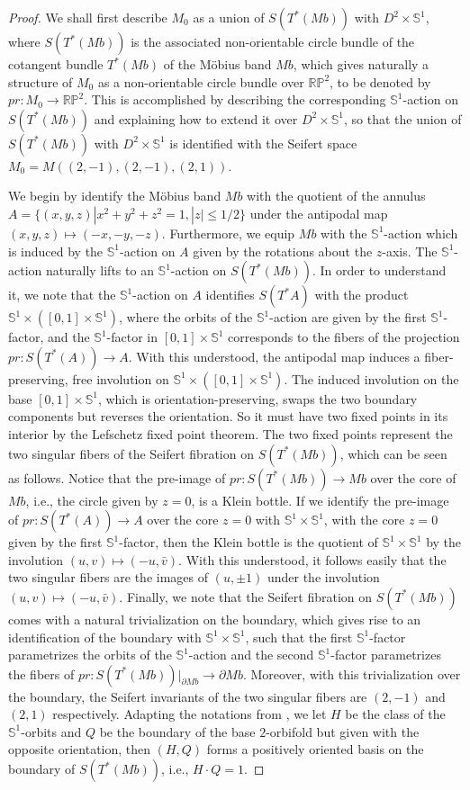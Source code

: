 \documentclass[11pt]{amsart}
\theoremstyle{plain}
\numberwithin{theorem}{section}
\theoremstyle{definition}
\newcommand{\R}{{\mathbb R}}
\renewcommand{\P}{{\mathbb P}}
\newcommand{\s}{{\mathbb S}}
\begin{document}
\begin{proof}
We shall first describe $M_0$ as a union of $S(T^\ast (Mb))$ with $D^2\times \s^1$, 
where $S(T^\ast (Mb))$ is the associated non-orientable circle bundle of the cotangent bundle 
$T^\ast (Mb)$ of the M\"{o}bius band $Mb$, which gives naturally a structure 
of $M_0$ as a non-orientable circle bundle over $\R\P^2$, to be denoted by 
$pr: M_0\rightarrow \R\P^2$. This is accomplished by describing the corresponding $\s^1$-action on 
$S(T^\ast (Mb))$ and explaining how to extend it over $D^2\times \s^1$, so that the union of 
$S(T^\ast (Mb))$ with $D^2\times \s^1$ is identified with the Seifert space 
$M_0=M((2,-1),(2,-1),(2,1))$. 

We begin by identify the M\"{o}bius band $Mb$ with the quotient of the annulus $A=\{(x,y,z)|x^2+y^2+z^2=1, |z|\leq 1/2\}$ under the antipodal map $(x,y,z)\mapsto (-x,-y,-z)$. Furthermore, we equip $Mb$ with the $\s^1$-action which is induced by the $\s^1$-action on $A$ given by the rotations about the $z$-axis. The $\s^1$-action naturally lifts to an $\s^1$-action on $S(T^\ast (Mb))$. In order to understand it, we note that the $\s^1$-action on $A$ identifies $S(T^\ast A)$ with the product
$\s^1\times ([0,1]\times \s^1)$, where the orbits of the $\s^1$-action are given by the first $\s^1$-factor,
and the $\s^1$-factor in $[0,1]\times \s^1$ corresponds to the fibers of the projection 
$pr: S(T^\ast (A))\rightarrow A$. With this understood, the antipodal map induces a fiber-preserving, free involution on $\s^1\times ([0,1]\times \s^1)$. The induced involution on the base $[0,1]\times \s^1$, which is orientation-preserving, swaps the two boundary components but reverses the orientation. So it must have two fixed points in its interior by the Lefschetz fixed point theorem. The two fixed points represent the two singular fibers of the Seifert fibration on $S(T^\ast (Mb))$, which can be seen as follows. Notice that the pre-image of
$pr: S(T^\ast (Mb))\rightarrow Mb$ over the core of $Mb$, i.e., the circle given by $z=0$, is a Klein bottle. If we identify the pre-image of $pr: S(T^\ast (A))\rightarrow A$ over the core $z=0$ with 
$\s^1\times \s^1$, with the core $z=0$ given by the first $\s^1$-factor, then the Klein bottle is the quotient of $\s^1\times \s^1$ by the involution $(u,v)\mapsto (-u,\bar{v})$. With this understood, it follows easily that the two singular fibers are the images of $(u,\pm 1)$ under the involution 
$(u,v)\mapsto (-u,\bar{v})$. Finally, we note that the Seifert fibration on $S(T^\ast (Mb))$ comes with a natural trivialization on the boundary, which gives rise to an identification of the boundary with 
$\s^1\times \s^1$, such that the first $\s^1$-factor parametrizes the orbits of the $\s^1$-action and the second 
$\s^1$-factor parametrizes the fibers of $pr: S(T^\ast (Mb))|_{\partial Mb}\rightarrow \partial Mb$. Moreover, with this trivialization over the boundary, the Seifert invariants of the two singular fibers are $(2,-1)$ and $(2,1)$
respectively. Adapting the notations from \cite{N}, we let $H$ be the class of the $\s^1$-orbits and $Q$ be the boundary of the base $2$-orbifold but given with the opposite orientation, then $(H,Q)$ forms a positively oriented basis on the boundary of  $S(T^\ast (Mb))$, i.e., $H\cdot Q=1$. 


\end{proof}
\end{document}
